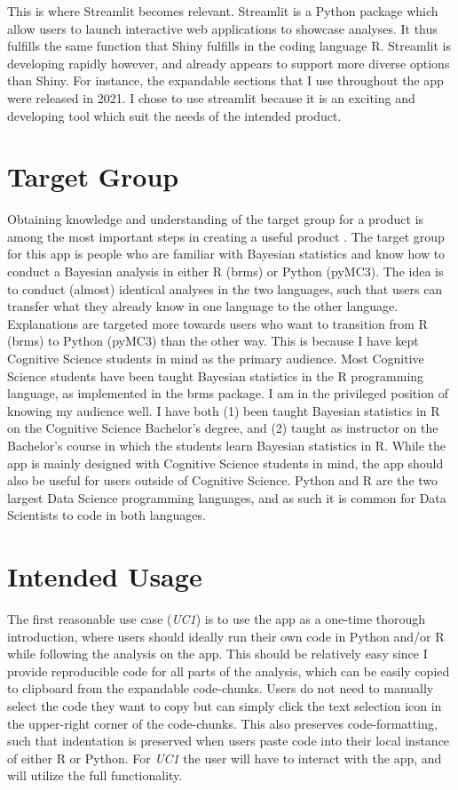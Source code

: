 \documentclass[12pt]{article}
\begin{document}
\vspace{5mm}

This is where Streamlit becomes relevant. Streamlit is a Python package which allow users
to launch interactive web applications to showcase analyses. It thus fulfills the same function
that Shiny fulfills in the coding language R. Streamlit is developing rapidly however,
and already appears to support more diverse options than Shiny. For instance,
the expandable sections that I use throughout the app were released in 2021. I chose to
use streamlit because it is an exciting and developing tool which suit the
needs of the intended product.

\section{Target Group}
Obtaining knowledge and understanding of the target group for a product is among the
most important steps in creating a useful product
\autocite[13]{mills1992macintosh}.
The target group for this app is people who are familiar with Bayesian statistics and know
how to conduct a Bayesian analysis in either R (brms) or Python (pyMC3). The idea is to
conduct (almost) identical analyses in the two languages, such that users can
transfer what they already know in one language to the other language.
Explanations are targeted more towards users who want to transition from R (brms)
to Python (pyMC3) than the other way. This is because I have kept Cognitive Science students
in mind as the primary audience. Most Cognitive Science students have been
taught Bayesian statistics in the R programming language, as implemented in the
brms package. I am in the privileged position of knowing my audience well. I
have both (1) been taught Bayesian statistics in R on the Cognitive Science
Bachelor's degree, and (2) taught as instructor on the Bachelor's course in which
the students learn Bayesian statistics in R.
While the app is mainly designed with Cognitive Science students in mind,
the app should also be useful for users outside of Cognitive Science.
Python and R are the two largest Data Science programming
languages, and as such it is common for Data Scientists to code in both
languages.

\section{Intended Usage}
The first reasonable use case (\emph{UC1}) is to use the app as a one-time
thorough introduction, where users should ideally run their own code in Python and/or R
while following the analysis on the app. This should be relatively easy since I provide reproducible code
for all parts of the analysis, which can be easily copied to clipboard from the expandable
code-chunks. Users do not need to manually select the code they want to copy but can simply click
the text selection icon in the upper-right corner of the code-chunks. This also
preserves code-formatting, such that indentation is preserved when users paste
code into their local instance of either R or Python.
For \emph{UC1} the user will have to interact with the app,
and will utilize the full functionality.
\end{document}
